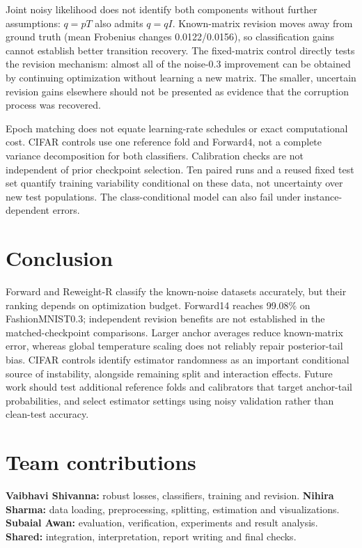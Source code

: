 \documentclass[12pt]{article}
\begin{document}
Joint noisy likelihood does not identify both components without further assumptions: $q=pT$ also admits $q=qI$. Known-matrix revision moves away from ground truth (mean Frobenius changes 0.0122/0.0156), so classification gains cannot establish better transition recovery. The fixed-matrix control directly tests the revision mechanism: almost all of the noise-0.3 improvement can be obtained by continuing optimization without learning a new matrix. The smaller, uncertain revision gains elsewhere should not be presented as evidence that the corruption process was recovered.

Epoch matching does not equate learning-rate schedules or exact computational cost. CIFAR controls use one reference fold and Forward4, not a complete variance decomposition for both classifiers. Calibration checks are not independent of prior checkpoint selection. Ten paired runs and a reused fixed test set quantify training variability conditional on these data, not uncertainty over new test populations. The class-conditional model can also fail under instance-dependent errors.

\section{Conclusion}
Forward and Reweight-R classify the known-noise datasets accurately, but their ranking depends on optimization budget. Forward14 reaches 99.08\% on FashionMNIST0.3; independent revision benefits are not established in the matched-checkpoint comparisons. Larger anchor averages reduce known-matrix error, whereas global temperature scaling does not reliably repair posterior-tail bias. CIFAR controls identify estimator randomness as an important conditional source of instability, alongside remaining split and interaction effects. Future work should test additional reference folds and calibrators that target anchor-tail probabilities, and select estimator settings using noisy validation rather than clean-test accuracy.

\section{Team contributions}
\textbf{Vaibhavi Shivanna:} robust losses, classifiers, training and revision. \textbf{Nihira Sharma:} data loading, preprocessing, splitting, estimation and visualizations. \textbf{Subaial Awan:} evaluation, verification, experiments and result analysis. \textbf{Shared:} integration, interpretation, report writing and final checks.
\end{document}
